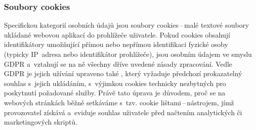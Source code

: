 \subsubsection*{Soubory cookies}
\label{sec:cookies}
Specifickou kategorií osobních údajů jsou soubory cookies\,--\,malé textové soubory ukládané webovou aplikací do prohlížeče uživatele.
Pokud cookies obsahují identifikátory umožňující přímou nebo nepřímou identifikaci fyzické osoby (typicky IP~adresa nebo identifikátor prohlížeče), jsou osobním údajem ve smyslu GDPR a~vztahují se na ně
všechny dříve uvedené zásady zpracování.
Vedle GDPR je jejich užívání upraveno také \cite[\S~89 (3)]{cz-2005-127}, který vyžaduje předchozí prokazatelný souhlas s~jejich ukládáním, s~výjimkou cookies technicky nezbytných pro poskytnutí požadované služby.
Právě tato úprava je důvodem, proč se na webových stránkách běžně setkáváme s~tzv. cookie lištami\,--\,nástrojem, jímž provozovatel získává a~eviduje souhlas uživatele před načtením analytických či marketingových skriptů.

